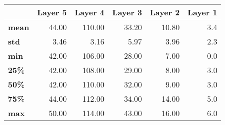 \begin{tabular}{lrrrrr}
\toprule
{} &  Layer 5 &  Layer 4 &  Layer 3 &  Layer 2 &  Layer 1 \\
\midrule
\textbf{mean} &    44.00 &   110.00 &    33.20 &    10.80 &      3.4 \\
\textbf{std } &     3.46 &     3.16 &     5.97 &     3.96 &      2.3 \\
\textbf{min } &    42.00 &   106.00 &    28.00 &     7.00 &      0.0 \\
\textbf{25\% } &    42.00 &   108.00 &    29.00 &     8.00 &      3.0 \\
\textbf{50\% } &    42.00 &   110.00 &    32.00 &     9.00 &      3.0 \\
\textbf{75\% } &    44.00 &   112.00 &    34.00 &    14.00 &      5.0 \\
\textbf{max } &    50.00 &   114.00 &    43.00 &    16.00 &      6.0 \\
\bottomrule
\end{tabular}
